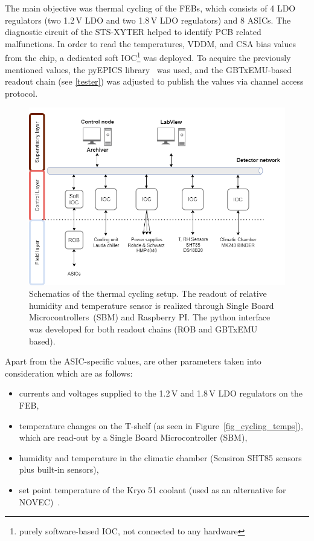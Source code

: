 The main objective was thermal cycling of the \glspl{FEB}, which consists of 4 LDO regulators (two 1.2\,V LDO and two 1.8\,V LDO regulators) and 8 \glspl{ASIC}. The diagnostic circuit of the STS-XYTER helped to identify \gls{PCB} related malfunctions. In order to read the temperatures, VDDM, and  \gls{CSA} bias values from the chip, a dedicated soft IOC\footnote{purely software-based \gls{IOC}, not connected to any hardware} was deployed. To acquire the previously mentioned values, the pyEPICS library~\cite{pyEPICS} was used, and the GBTxEMU-based readout chain (see \autoref{tester}) was adjusted to publish the values via channel access protocol. 
\begin{figure}[!h]
\centering
\includegraphics[width=0.85\columnwidth]{Chapter4/images/cycling_scheme.png}
\caption{Schematics of the thermal cycling setup. The readout of relative humidity and temperature sensor is realized through Single Board Microcontrollers~(\gls{SBM}) and Raspberry PI. The python interface was developed for both readout chains (ROB and GBTxEMU based). }
\label{fig_setup}
\end{figure}


Apart from the \gls{ASIC}-specific values, are other parameters taken into consideration which are as
follows:
\begin{itemize}
    \item currents and voltages supplied to the 1.2\,V and 1.8\,V \gls{LDO} regulators on the \gls{FEB}, 
    \item temperature changes on the T-shelf (as seen in Figure~\ref{fig_cycling_temps}), which are read-out by a Single Board Microcontroller (\gls{SBM}),
    \item humidity and temperature in the climatic chamber (Sensiron SHT85 sensors plus built-in sensors),
    \item set point temperature of the Kryo 51 coolant (used as an alternative for NOVEC)~\cite{KRYO}.
\end{itemize}

